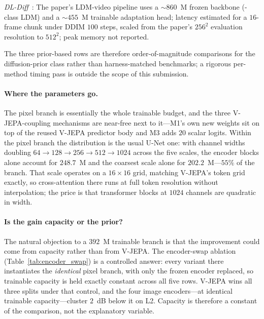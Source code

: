 \emph{DL-Diff}~\citep{dl_diff}: The paper's LDM-video pipeline uses a $\sim\!860$~M frozen backbone (-class LDM) and a $\sim\!455$~M trainable adaptation head; latency estimated for a $16$-frame chunk under DDIM $100$ steps, scaled from the paper's $256^{2}$ evaluation resolution to $512^{2}$; peak memory not reported.

The three prior-based rows are therefore order-of-magnitude comparisons for the diffusion-prior class rather than harness-matched benchmarks; a rigorous per-method timing pass is outside the scope of this submission.

\paragraph{Where the parameters go.} The pixel branch is essentially the whole trainable budget, and the three V-JEPA-coupling mechanisms are near-free next to it---M1's own new weights sit on top of the reused V-JEPA predictor body and M3 adds $20$ scalar logits. Within the pixel branch the distribution is the usual U-Net one: with channel widths doubling $64{\to}128{\to}256{\to}512{\to}1024$ across the five scales, the encoder blocks alone account for $248.7$~M and the coarsest scale alone for $202.2$~M---$55\%$ of the branch. That scale operates on a $16{\times}16$ grid, matching V-JEPA's token grid exactly, so cross-attention there runs at full token resolution without interpolation; the price is that transformer blocks at $1024$ channels are quadratic in width.

\paragraph{Is the gain capacity or the prior?} The natural objection to a $392$~M trainable branch is that the improvement could come from capacity rather than from V-JEPA. The encoder-swap ablation (Table~\ref{tab:encoder_swap}) is a controlled answer: every variant there instantiates the \emph{identical} pixel branch, with only the frozen encoder replaced, so trainable capacity is held exactly constant across all five rows. V-JEPA wins all three splits under that control, and the four image encoders---at identical trainable capacity---cluster $2$~dB below it on L2. Capacity is therefore a constant of the comparison, not the explanatory variable.

